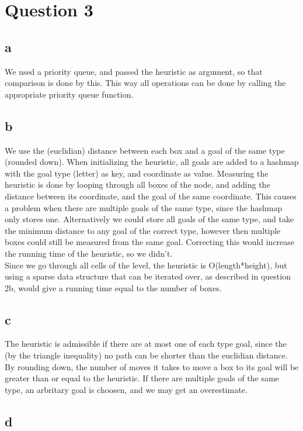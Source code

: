 \documentclass{article}
\begin{document}
\section{Question 3}
\subsection{a}
We used a priority queue, and passed the heuristic as argument, so that comparison is done by this. This way all operations can be done by calling the appropriate priority queue function.

\subsection{b}
We use the (euclidian) distance between each box and a goal of the same type (rounded down). When initializing the heuristic, all goals are added to a hashmap with the goal type (letter) as key, and coordinate as value. Measuring the heuristic is done by looping through all boxes of the node, and adding the distance between its
coordinate, and the goal of the same coordinate. This causes a problem when there are multiple goals of the same type, since the hashmap only stores one. Alternatively we could store all goals of the same type, and take the minimum distance to any goal of the correct type, however then multiple boxes could still be measured from the same goal. Correcting this would increase the running time of the heuristic, so we didn't.\\

Since we go through all cells of the level, the heuristic is O(length*height), but using a sparse data structure that can be iterated over, as described in question 2b, would give a running time equal to the number of boxes.

\subsection{c}
The heuristic is admissible if there are at most one of each type goal, since the (by the triangle inequality) no path can be shorter than the euclidian distance. By rounding down, the number of moves it takes to move
a box to its goal will be greater than or equal to the heuristic. If there are multiple goals of the same type, an arbritary goal is choosen, and we may get an overestimate.

\subsection{d}
\end{document}
